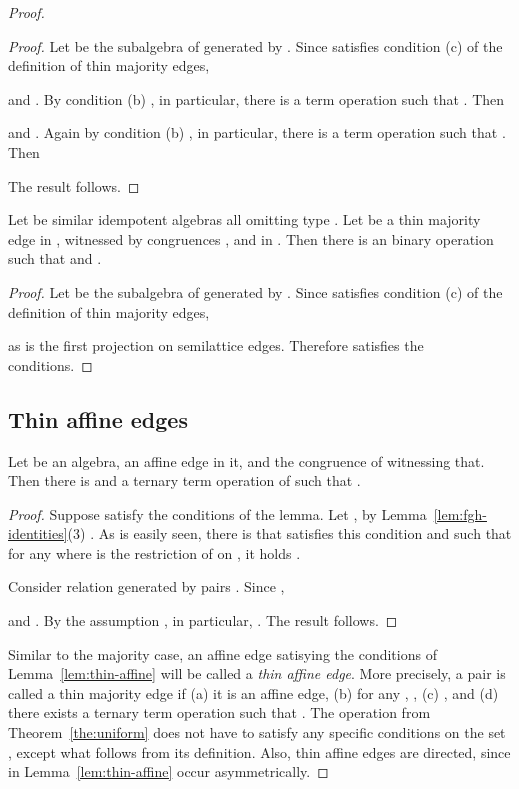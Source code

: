 \documentclass[11pt]{article}
\begin{document}
\begin{proof}
\begin{proof}
Let  be the subalgebra of  generated by 
. Since  satisfies condition
(c) of the definition of thin majority edges,

and . By condition (b)
, in particular, there is a term operation  such that 
. Then 

and . Again by condition (b) , in particular, 
there is a term operation  such that . Then 

The result follows.
\end{proof}

\begin{lemma}\label{lem:majority-sl}
Let  be similar idempotent algebras all omitting type \one.
Let  be a thin majority edge in , witnessed by congruences , and 
 in . Then there is an binary operation  such that  and 
.
\end{lemma}

\begin{proof}
Let  be the subalgebra of 
 generated by . Since  satisfies condition (c) of
the definition of thin majority edges,

as  is the first projection on semilattice edges. Therefore  satisfies 
the conditions.
\end{proof}


\subsection{Thin affine edges}\label{sec:thin-affine}

\begin{lemma}\label{lem:thin-affine}
Let  be an algebra,  an affine edge in it, and  the congruence of 
 witnessing that. Then there is  and a ternary term operation 
 of  such that  .
\end{lemma}

\begin{proof}
Suppose  satisfy the conditions of the lemma. 
Let , by Lemma~\ref{lem:fgh-identities}(3) . 
As is easily seen, there is  that satisfies this condition and such that for any 
 where  is the restriction of  on , it holds
.

Consider relation  generated by pairs . Since , 

and . By the assumption , in particular, . 
The result follows.
\end{proof}

Similar to the majority case, an affine edge satisying the conditions of 
Lemma~\ref{lem:thin-affine} will be called a \emph{thin affine edge}. More precisely, 
a pair  is called a thin majority edge if (a) it is an affine edge, (b) for any 
, , (c) , and (d) there exists a ternary 
term operation  such that .  The operation  from 
Theorem~\ref{the:uniform} does not have to satisfy any specific conditions on 
the set , except what follows from its definition. Also, thin affine edges
are directed, since  in Lemma~\ref{lem:thin-affine} occur asymmetrically.


\end{proof}
\end{document}
